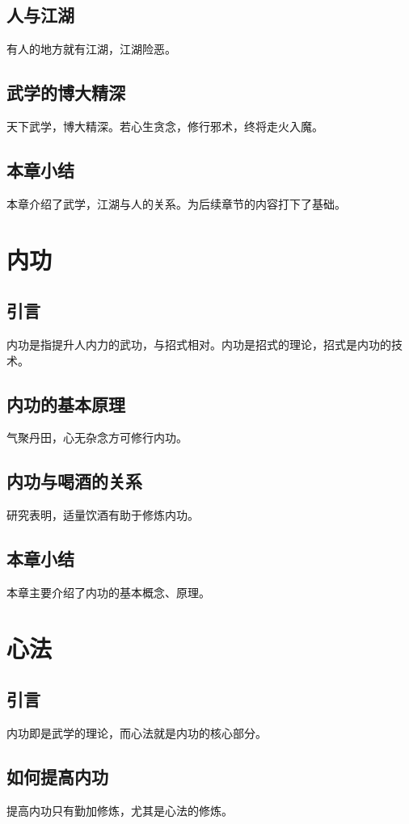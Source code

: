 \documentclass[algorithmlist, figurelist,tablelist, nomlist,engineering]{seuthesix}
\begin{document}
\section{人与江湖}
有人的地方就有江湖，江湖险恶。

\section{武学的博大精深}
天下武学，博大精深。若心生贪念，修行邪术，终将走火入魔。

\section{本章小结}
本章介绍了武学，江湖与人的关系。为后续章节的内容打下了基础。

\chapter{内功}
\section{引言}
内功是指提升人内力的武功，与招式相对。内功是招式的理论，招式是内功的技术。

\section{内功的基本原理}
气聚丹田，心无杂念方可修行内功。

\section{内功与喝酒的关系}
研究表明，适量饮酒有助于修炼内功。



\section{本章小结}
本章主要介绍了内功的基本概念、原理。

\chapter{心法}
\section{引言}
内功即是武学的理论，而心法就是内功的核心部分。
\section{如何提高内功}
提高内功只有勤加修炼，尤其是心法的修炼。
\end{document}
